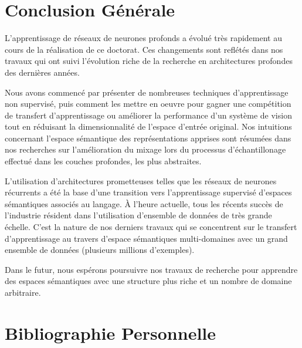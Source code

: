 
\chapter{Conclusion Générale}

L'apprentissage de réseaux de neurones profonds a évolué très rapidement au
cours de la réalisation de ce doctorat. Ces changements sont reflétés dans nos
travaux qui ont suivi l'évolution riche de la recherche en architectures
profondes des dernières années.

Nous avons commencé par présenter de nombreuses techniques d'apprentissage non
supervisé, puis comment les mettre en oeuvre pour gagner une compétition de
transfert d'apprentissage ou améliorer la performance d'un système de vision
tout en réduisant la dimensionnalité de l'espace d'entrée original.  Nos
intuitions concernant l'espace sémantique des représentations apprises sont
résumées dans nos recherches sur l'amélioration du mixage lors du processus
d'échantillonage effectué dans les couches profondes, les plus abstraites.

L'utilisation d'architectures prometteuses telles que les réseaux de neurones
récurrents a été la base d'une transition vers l'apprentissage supervisé
d'espaces sémantiques associés au langage. À l'heure actuelle, tous les récents succès de
l'industrie résident dans l'utilisation d'ensemble de données de très grande échelle.
C'est la nature de nos derniers travaux qui se concentrent sur le transfert
d'apprentissage au travers d'espace sémantiques multi-domaines avec un grand
ensemble de données (plusieurs millions d'exemples).

Dans le futur, nous espérons poursuivre nos travaux de recherche pour apprendre
des espaces sémantiques avec une structure plus riche et un nombre de domaine
arbitraire.

\chapter*{Bibliographie Personnelle}

